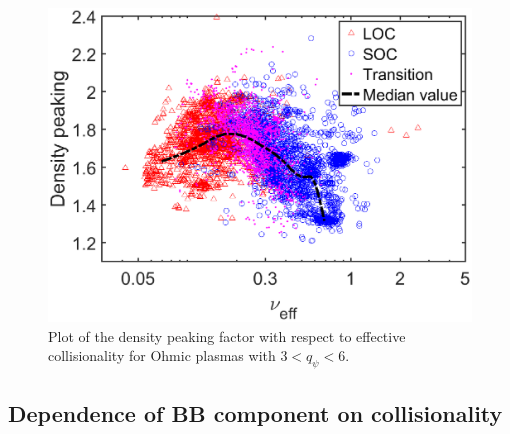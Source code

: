 \begin{figure}[h]
\begin{centering}
\includegraphics[scale=0.55]{fig_peak_nu_OH_med.eps}
\par\end{centering}
\caption{Plot of the density peaking factor with respect to effective collisionality for Ohmic plasmas with $3 < q_{\psi} <6$.}
\label{fig:peak_nu_OH}
\end{figure}




\subsection{Dependence of BB component on collisionality}

